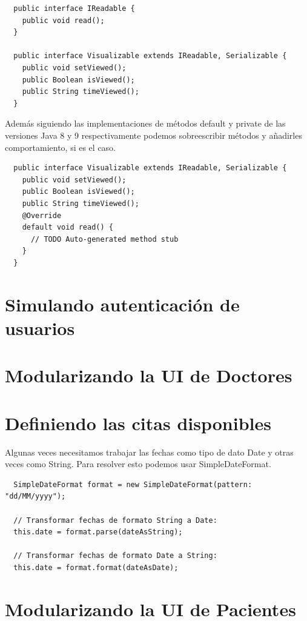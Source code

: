 \documentclass{article}
\begin{document}
\begin{verbatim}
  public interface IReadable {
    public void read();
  }

  public interface Visualizable extends IReadable, Serializable {
    public void setViewed();
    public Boolean isViewed();
    public String timeViewed();
  }
\end{verbatim}

Además siguiendo las implementaciones de métodos default y private de las
versiones Java 8 y 9 respectivamente podemos sobreescribir métodos y añadirles
comportamiento, si es el caso.\\

\begin{verbatim}
  public interface Visualizable extends IReadable, Serializable {
    public void setViewed();
    public Boolean isViewed();
    public String timeViewed();
    @Override
    default void read() {
      // TODO Auto-generated method stub
    }
  }
\end{verbatim}


\section{Simulando autenticación de usuarios}%


\section{Modularizando la UI de Doctores}%


\section{Definiendo las citas disponibles}%
Algunas veces necesitamos trabajar las fechas como tipo de dato Date y otras
veces como String. Para resolver esto podemos usar SimpleDateFormat.\\

\begin{verbatim}
  SimpleDateFormat format = new SimpleDateFormat(pattern: "dd/MM/yyyy");

  // Transformar fechas de formato String a Date:
  this.date = format.parse(dateAsString);

  // Transformar fechas de formato Date a String:
  this.date = format.format(dateAsDate);
\end{verbatim}


\section{Modularizando la UI de Pacientes}%
\end{document}
